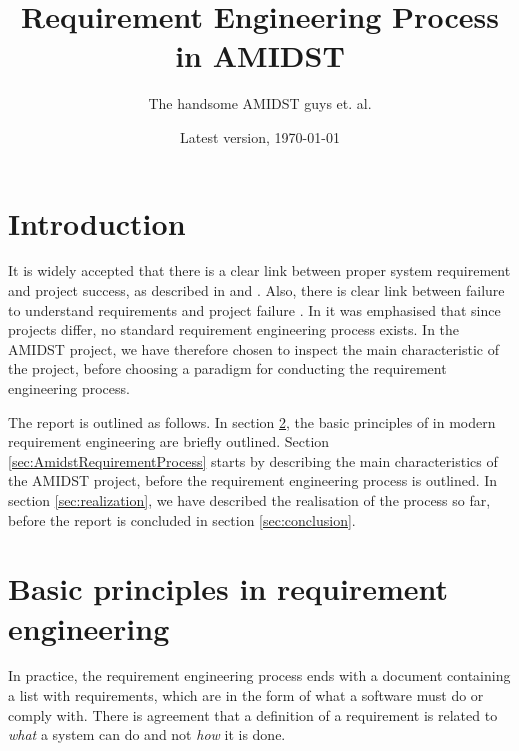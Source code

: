 \documentclass[11pt, oneside]{article}   	%
\title{Requirement Engineering Process in AMIDST}
\author{The handsome AMIDST guys et. al.}
\date{Latest version, \today}							%
\begin{document}
\maketitle
%
%
\section{Introduction}

It is widely accepted that there is a clear link between proper system requirement and project success, as described in  \cite{Boe91} and \cite{Jac99}.  Also, there is clear link between failure to understand requirements and project failure \cite{Ewu03}.  
In \cite{Ebe10} it was emphasised that since projects differ, no standard requirement engineering process exists.  In the AMIDST project, we have therefore chosen to inspect the main characteristic of the project, before choosing a paradigm for conducting the requirement engineering process.

The report is outlined as follows.  In section \ref{sec:stateOfArt}, the basic principles of in modern requirement engineering are briefly outlined.  Section \ref{sec:AmidstRequirementProcess} starts by describing the main characteristics of the AMIDST project, before the requirement engineering process is outlined.  In section \ref{sec:realization}, we have described the realisation of the process so far, before the report is concluded in section \ref{sec:conclusion}.


\section{Basic principles in requirement engineering}
\label{sec:stateOfArt}

In practice, the requirement engineering process ends with a document containing a list with requirements, which are in the form of what a software must do or comply with.  There is agreement that a definition of a requirement is related to \emph{what} a system can do and not \emph{how} it is done.  
\end{document}
